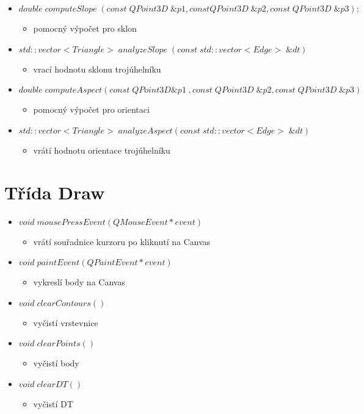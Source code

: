 \documentclass[oneside,12pt,a4paper]{book}
\begin{document}
\begin{itemize}
\begin{itemize}
    \end{itemize}
    \item $double\; computeSlope\;(const\; QPoint3D\; \&p1, const QPoint3D\; \&p2, const\; QPoint3D\; \&p3);$
        \begin{itemize}
    \item pomocný výpočet pro sklon
    \end{itemize}
    \item $std::vector<Triangle>\; analyzeSlope\;(const\; std::vector<Edge>\; \&dt)$
        \begin{itemize}
    \item vrací hodnotu sklonu trojúhelníku
    \end{itemize}
    \item $double\; computeAspect(const\; QPoint3D \&p1\;, const\; QPoint3D\; \&p2,const\; QPoint3D\; \&p3)$
        \begin{itemize}
    \item pomocný výpočet pro orientaci
    \end{itemize}
    \item $std::vector<Triangle>\; analyzeAspect(const\; std::vector<Edge>\; \&dt)$
        \begin{itemize}
    \item vrátí hodnotu orientace trojúhelníku
    \end{itemize}
\end{itemize}

   \section{Třída Draw} 
    \begin{itemize}
    \item $void\; mousePressEvent(QMouseEvent *event)$
    \begin{itemize}
    \item vrátí souřadnice kurzoru po kliknutí na Canvas
    \end{itemize}
    \item $void\; paintEvent(QPaintEvent *event)$
    \begin{itemize}
    \item vykreslí body na Canvas
    \end{itemize}
        \item $void\; clearContours()$
    \begin{itemize}
    \item vyčistí vrstevnice
        \end{itemize}
    \item $void\; clearPoints()$
    \begin{itemize}
    \item vyčistí body
    \end{itemize}
            \item $void\; clearDT()$
    \begin{itemize}
    \item vyčistí DT
    \end{itemize}
\end{itemize}
\end{document}
